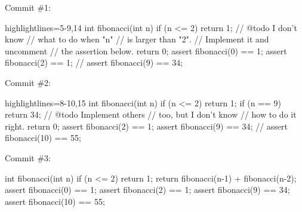 \documentclass{article}
\begin{document}


\begin{pptWide}{3}
Commit \#1:\par
{\scriptsize\begin{ffcode*}{highlightlines={5-9,14}}
int fibonacci(int n) {
  if (n <= 2) {
    return 1;
  }
  // @todo I don't know
  // what to do when "n"
  // is larger than "2".
  // Implement it and uncomment
  // the assertion below.
  return 0;
}
assert fibonacci(0) == 1;
assert fibonacci(2) == 1;
// assert fibonacci(9) == 34;
\end{ffcode*}
}
\par\columnbreak\par
Commit \#2:\par
{\scriptsize\begin{ffcode*}{highlightlines={8-10,15}}
int fibonacci(int n) {
  if (n <= 2) {
    return 1;
  }
  if (n == 9) {
    return 34;
  }
  // @todo Implement others
  // too, but I don't know
  // how to do it right.
  return 0;
}
assert fibonacci(2) == 1;
assert fibonacci(9) == 34;
// assert fibonacci(10) == 55;
\end{ffcode*}
}
\par\columnbreak\par
Commit \#3:\par
{\scriptsize\begin{ffcode*}{}
int fibonacci(int n) {
  if (n <= 2) {
    return 1;
  }
  return fibonacci(n-1)
    + fibonacci(n-2);
}
assert fibonacci(0) == 1;
assert fibonacci(2) == 1;
assert fibonacci(9) == 34;
assert fibonacci(10) == 55;
\end{ffcode*}
}
\end{pptWide}
\plush{}

\end{document}

